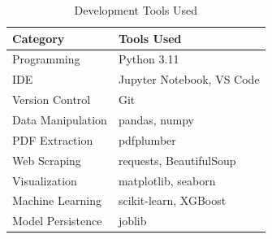 	\begin{table}[h]
		\begin{center}
			\begin{tabular}{|l|l|}
				\hline
				\textbf{Category} & \textbf{Tools Used} \\
				\hline
				Programming & Python 3.11 \\
				\hline
				IDE & Jupyter Notebook, VS Code \\
				\hline
				Version Control & Git \\
				\hline
				Data Manipulation & pandas, numpy \\
				\hline
				PDF Extraction & pdfplumber \\
				\hline
				Web Scraping & requests, BeautifulSoup \\
				\hline
				Visualization & matplotlib, seaborn \\
				\hline
				Machine Learning & scikit-learn, XGBoost \\
				\hline
				Model Persistence & joblib \\
				\hline
			\end{tabular}
		\end{center}
		\caption{Development Tools Used}
	\end{table}